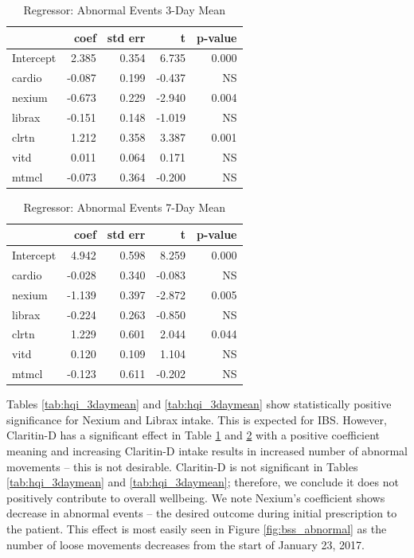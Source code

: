 \documentclass[conference]{IEEEtran}
\begin{document}
\begin{table}
\begin{center}
    \caption{Regressor: Abnormal Events 3-Day Mean} \label{tab:abnormal_3daymean}
    \begin{tabular}{ | l | r | r | r | r |}
    \hline
     & coef & std err & t & p-value \\ \hline
Intercept & 2.385 & 0.354 & 6.735 & 0.000 \\
cardio & -0.087 & 0.199 & -0.437 & NS \\
nexium & -0.673 & 0.229 & -2.940 & 0.004 \\
librax & -0.151 & 0.148 & -1.019 & NS \\
clrtn & 1.212 & 0.358 & 3.387 & 0.001 \\
vitd & 0.011 & 0.064 & 0.171 & NS \\
mtmcl & -0.073 & 0.364 & -0.200 & NS \\
    \hline
    \end{tabular}
\end{center}
\end{table}

\begin{table}
\begin{center}
\caption{Regressor: Abnormal Events 7-Day Mean} \label{tab:abnormal_7daymean}
    \begin{tabular}{ | l | r | r | r | r |}
    \hline
     & coef & std err & t & p-value \\ \hline
Intercept & 4.942 & 0.598 & 8.259 & 0.000 \\
cardio & -0.028 & 0.340 & -0.083 & NS \\
nexium & -1.139 & 0.397 & -2.872 & 0.005 \\
librax & -0.224 & 0.263 & -0.850 & NS \\
clrtn & 1.229 & 0.601 & 2.044 & 0.044 \\
vitd & 0.120 & 0.109 & 1.104 & NS \\
mtmcl & -0.123 & 0.611 & -0.202 & NS \\
    \hline
    \end{tabular}
\end{center}
\end{table}

Tables \ref{tab:hqi_3daymean} and \ref{tab:hqi_3daymean} show statistically positive significance for Nexium and Librax intake.  This is expected for IBS.  However, Claritin-D has a significant effect in Table \ref{tab:abnormal_3daymean} and \ref{tab:abnormal_7daymean} with a positive coefficient  meaning and increasing Claritin-D intake results in increased number of abnormal movements -- this is not desirable. Claritin-D is not significant in Tables \ref{tab:hqi_3daymean} and \ref{tab:hqi_3daymean}; therefore, we conclude it does not positively contribute to overall wellbeing.  We note Nexium's coefficient shows decrease in abnormal events -- the desired outcome during initial prescription to the patient.  This effect is most easily seen in Figure \ref{fig:bss_abnormal} as the number of loose movements decreases from the start of January 23, 2017.
\end{document}
